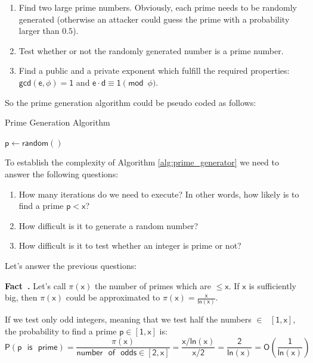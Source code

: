 \documentclass{article}
\newcounter{fact}[section]
\newenvironment{fact}[1][]{\refstepcounter{fact}\par\medskip
   \noindent \textbf{Fact~\thefact. #1} \rmfamily}{\medskip}
\begin{document}
\begin{enumerate}
    \item Find two large prime numbers. Obviously, each prime needs to be randomly generated (otherwise an attacker could guess the prime with a probability larger than $\mathsf{0.5}$). 
    \item Test whether or not the randomly generated number is a prime number.
    \item Find a public and a private exponent which fulfill the required properties: $\mathsf{gcd(e, \phi) = 1}$ and $\mathsf{e \cdot d \equiv 1 \pmod{\phi}}$.
\end{enumerate}

\par \noindent So the prime generation algorithm could be pseudo coded as follows:

\begin{algorithm}
    \caption{Prime Generation Algorithm}
    \label{alg:prime_generator}
    \begin{algorithmic}
        \Repeat
            \State $\mathsf{p \gets random()}$
    \end{algorithmic}
\end{algorithm}

\par \noindent To establish the complexity of Algorithm \ref{alg:prime_generator} we need to answer the following questions:
\begin{enumerate}
    \item How many iterations do we need to execute? In other words, how likely is to find a prime $\mathsf{p < x}$?
    \item How difficult is it to generate a random number?
    \item How difficult is it to test whether an integer is prime or not?
\end{enumerate}

\par \noindent Let's answer the previous questions:

\begin{fact}
    Let's call $\mathsf{\pi(x)}$ the number of primes which are $\mathsf{\leq x}$. If $\mathsf{x}$ is sufficiently big, then $\mathsf{\pi(x)}$ could be approximated to $\mathsf{\pi(x) = \frac{x}{ln(x)}}$.
\end{fact}

\par \noindent If we test only odd integers, meaning that we test half the numbers $\mathsf{\in \text{ } [1, x]}$, the probability to find a prime $\mathsf{p \in [1, x]}$ is:
$$
    \mathsf{P(p \text{ } is \text{ } prime) = \frac{\pi(x)}{number \text{ } of \text{ } odds \in [2,x]} = \frac{x/ln(x)}{x/2} = \frac{2}{ln(x)} = O \left( \frac{1}{ln(x)} \right)}
$$
\end{document}
